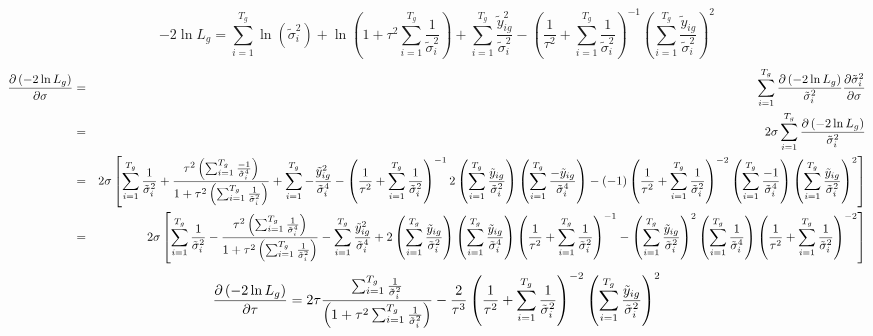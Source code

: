 \documentclass[12pt]{article}
\begin{document}
\[
-2\ln L_{g}=\sum_{i=1}^{T_{g}}\ln \left( \tilde{\sigma}_{i}^{2}\right) +\ln
\left( 1+\tau ^{2}\sum_{i=1}^{T_{g}}\frac{1}{\tilde{\sigma}_{i}^{2}}\right)
+\sum_{i=1}^{T_{g}}\frac{\tilde{y}_{ig}^{2}}{\tilde{\sigma}_{i}^{2}}-\left( 
\frac{1}{\tau ^{2}}+\sum_{i=1}^{T_{g}}\frac{1}{\tilde{\sigma}_{i}^{2}}%
\right) ^{-1}\left( \sum_{i=1}^{T_{g}}\frac{\tilde{y}_{ig}}{\tilde{\sigma}%
_{i}^{2}}\right) ^{2} 
\]%
\begin{eqnarray*}
\frac{\partial \left( -2\ln L_{g}\right) }{\partial \sigma }
&=&\sum_{i=1}^{T_{g}}\frac{\partial \left( -2\ln L_{g}\right) }{\tilde{\sigma%
}_{i}^{2}}\frac{\partial \tilde{\sigma}_{i}^{2}}{\partial \sigma } \\
&=&2\sigma \sum_{i=1}^{T_{g}}\frac{\partial \left( -2\ln L_{g}\right) }{%
\tilde{\sigma}_{i}^{2}} \\
&=&2\sigma \left[ \sum_{i=1}^{T_{g}}\frac{1}{\tilde{\sigma}_{i}^{2}}+\frac{%
\tau ^{2}\left( \sum_{i=1}^{T_{g}}\frac{-1}{\tilde{\sigma}_{i}^{4}}\right) }{%
1+\tau ^{2}\left( \sum_{i=1}^{T_{g}}\frac{1}{\tilde{\sigma}_{i}^{2}}\right) }%
+\sum_{i=1}^{T_{g}}-\frac{\tilde{y}_{ig}^{2}}{\tilde{\sigma}_{i}^{4}}-\left( 
\frac{1}{\tau ^{2}}+\sum_{i=1}^{T_{g}}\frac{1}{\tilde{\sigma}_{i}^{2}}%
\right) ^{-1}2\left( \sum_{i=1}^{T_{g}}\frac{\tilde{y}_{ig}}{\tilde{\sigma}%
_{i}^{2}}\right) \left( \sum_{i=1}^{T_{g}}\frac{-\tilde{y}_{ig}}{\tilde{%
\sigma}_{i}^{4}}\right) -\left( -1\right) \left( \frac{1}{\tau ^{2}}%
+\sum_{i=1}^{T_{g}}\frac{1}{\tilde{\sigma}_{i}^{2}}\right) ^{-2}\left(
\sum_{i=1}^{T_{g}}\frac{-1}{\tilde{\sigma}_{i}^{4}}\right) \left(
\sum_{i=1}^{T_{g}}\frac{\tilde{y}_{ig}}{\tilde{\sigma}_{i}^{2}}\right) ^{2}%
\right] \\
&=&2\sigma \left[ \sum_{i=1}^{T_{g}}\frac{1}{\tilde{\sigma}_{i}^{2}}-\frac{%
\tau ^{2}\left( \sum_{i=1}^{T_{g}}\frac{1}{\tilde{\sigma}_{i}^{4}}\right) }{%
1+\tau ^{2}\left( \sum_{i=1}^{T_{g}}\frac{1}{\tilde{\sigma}_{i}^{2}}\right) }%
-\sum_{i=1}^{T_{g}}\frac{\tilde{y}_{ig}^{2}}{\tilde{\sigma}_{i}^{4}}+2\left(
\sum_{i=1}^{T_{g}}\frac{\tilde{y}_{ig}}{\tilde{\sigma}_{i}^{2}}\right)
\left( \sum_{i=1}^{T_{g}}\frac{\tilde{y}_{ig}}{\tilde{\sigma}_{i}^{4}}%
\right) \left( \frac{1}{\tau ^{2}}+\sum_{i=1}^{T_{g}}\frac{1}{\tilde{\sigma}%
_{i}^{2}}\right) ^{-1}-\left( \sum_{i=1}^{T_{g}}\frac{\tilde{y}_{ig}}{\tilde{%
\sigma}_{i}^{2}}\right) ^{2}\left( \sum_{i=1}^{T_{g}}\frac{1}{\tilde{\sigma}%
_{i}^{4}}\right) \left( \frac{1}{\tau ^{2}}+\sum_{i=1}^{T_{g}}\frac{1}{%
\tilde{\sigma}_{i}^{2}}\right) ^{-2}\right]
\end{eqnarray*}%
\[
\frac{\partial \left( -2\ln L_{g}\right) }{\partial \tau }=2\tau \frac{%
\sum_{i=1}^{T_{g}}\frac{1}{\tilde{\sigma}_{i}^{2}}}{\left( 1+\tau
^{2}\sum_{i=1}^{T_{g}}\frac{1}{\tilde{\sigma}_{i}^{2}}\right) }-\frac{2}{%
\tau ^{3}}\left( \frac{1}{\tau ^{2}}+\sum_{i=1}^{T_{g}}\frac{1}{\tilde{\sigma%
}_{i}^{2}}\right) ^{-2}\left( \sum_{i=1}^{T_{g}}\frac{\tilde{y}_{ig}}{\tilde{%
\sigma}_{i}^{2}}\right) ^{2} 
\]
\end{document}
